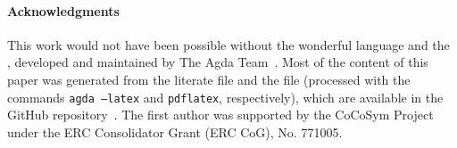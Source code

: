 \paragraph*{Acknowledgments}
This work would not have been possible without the wonderful \agda language and the
\agdastdlib, developed and
maintained by The Agda Team~\cite{agdastdlib}.
Most of the content of this paper was generated from the literate \agda file \HSPlagda and the \LaTeXe file \agdahsp (processed with the commands
\texttt{agda --latex} and \texttt{pdflatex}, respectively), which are available in the \agdaalgebras GitHub repository~\cite{ualib_v2.0.1}.
The first author was supported by the CoCoSym Project under the ERC Consolidator Grant (ERC CoG), No. 771005.




